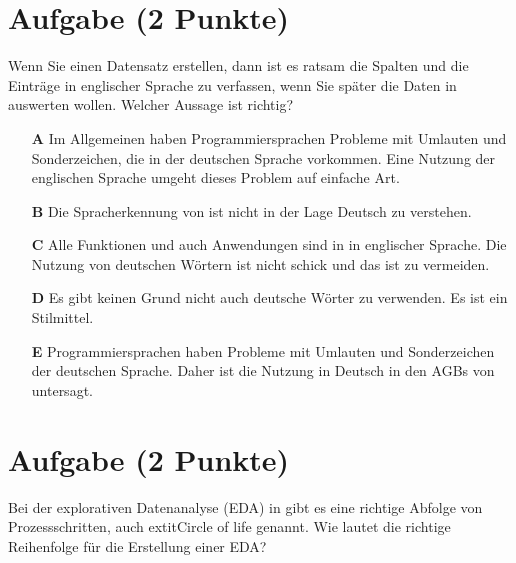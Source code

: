 \documentclass[a4paper, 9pt]{scrartcl}\usepackage[]{graphicx}\usepackage[]{xcolor}
\begin{document}
\section{Aufgabe \hfill (2 Punkte)}



Wenn Sie einen Datensatz erstellen, dann ist es ratsam die Spalten und die Einträge in englischer Sprache zu verfassen, wenn Sie später die Daten in \Rlogo auswerten wollen. Welcher Aussage ist richtig?



\begin{enumerate}
\item [\textbf{A} \msquare] Im Allgemeinen haben Programmiersprachen Probleme mit Umlauten und Sonderzeichen, die in der deutschen Sprache vorkommen. Eine Nutzung der englischen Sprache umgeht dieses Problem auf einfache Art.
\item [\textbf{B} \msquare] Die Spracherkennung von \Rlogo ist nicht in der Lage Deutsch zu verstehen.
\item [\textbf{C} \msquare] Alle Funktionen und auch Anwendungen sind in \Rlogo in englischer Sprache. Die Nutzung von deutschen Wörtern ist nicht schick und das ist zu vermeiden.
\item [\textbf{D} \msquare] Es gibt keinen Grund nicht auch deutsche Wörter zu verwenden. Es ist ein Stilmittel.
\item [\textbf{E} \msquare] Programmiersprachen haben Probleme mit Umlauten und Sonderzeichen der deutschen Sprache. Daher ist die Nutzung in Deutsch in den AGBs von \Rlogo untersagt.
\end{enumerate}

\section{Aufgabe \hfill (2 Punkte)}



Bei der explorativen Datenanalyse (EDA) in \Rlogo gibt es eine richtige Abfolge von Prozessschritten, auch 	extit{Circle of life} genannt. Wie lautet die richtige Reihenfolge für die Erstellung einer EDA?
\end{document}
